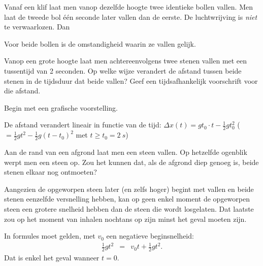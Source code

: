 \documentclass{ximera}
\begin{document}
\begin{exercise}
	Vanaf een klif laat men vanop dezelfde hoogte twee identieke bollen vallen. Men laat de tweede bol één seconde later vallen dan de eerste. De luchtwrijving is \textit{niet} te verwaarlozen. Dan
	\begin{multipleChoice}
	\end{multipleChoice}
	\begin{oplossing}
		Voor beide bollen is de omstandigheid waarin ze vallen gelijk.
	\end{oplossing}
\end{exercise}

\begin{exercise}
	Vanop een grote hoogte laat men achtereenvolgens twee stenen vallen met een tussentijd van 2 seconden. Op welke wijze verandert de afstand tussen beide stenen in de tijdsduur dat beide vallen? Geef een tijdsafhankelijk voorschrift voor die afstand.
	\begin{hint}
		Begin met een grafische voorstelling.
	\end{hint}
	\begin{oplossing}
		De afstand verandert lineair in functie van de tijd: $\Delta x(t)=gt_0\cdot t-\frac{1}{2}gt_0^2$ ($=\frac{1}{2}gt^2-\frac{1}{2}g(t-t_0)^2$ met $t\geq t_0=\SI{2}{s}$)
	\end{oplossing}
\end{exercise}

\begin{exercise}
	Aan de rand van een afgrond laat men een steen vallen. Op hetzelfde ogenblik werpt men een steen op. Zou het kunnen dat, als de afgrond diep genoeg is, beide stenen elkaar nog ontmoeten?

	\begin{oplossing}
		Aangezien de opgeworpen steen later (en zelfs hoger) begint met vallen en beide stenen eenzelfde versnelling hebben, kan op geen enkel moment de opgeworpen steen een grotere snelheid hebben dan de steen die wordt losgelaten. Dat laatste zou op het moment van inhalen nochtans op zijn minst het geval moeten zijn.

		In formules moet gelden, met $v_0$ een negatieve beginsnelheid:
		\begin{eqnarray*}
			\frac{1}{2}gt^2&=&v_0t+\frac{1}{2}gt^2.
		\end{eqnarray*}
		Dat is enkel het geval wanneer $t=0$.
	\end{oplossing}
\end{exercise}
\end{document}
